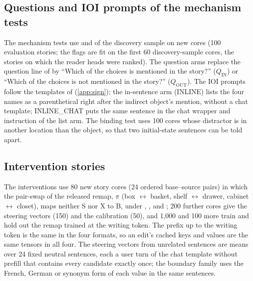 \subsection{Questions and IOI prompts of the mechanism tests}\label{app:prompts-mechanism}

The mechanism tests use \fmtOpt{} and \fmtPost{} of the discovery sample on new cores (100 evaluation stories; the flags are fit on the first 60 discovery-sample cores, the stories on which the reader heads were ranked). The question arms replace the question line of \fmtOpt{} by ``Which of the choices is mentioned in the story?'' ($Q_{\mathrm{IN}}$) or ``Which of the choices is not mentioned in the story?'' ($Q_{\mathrm{OUT}}$). The IOI prompts follow the templates of \citet{wang2022ioi} (\cref{app:sign}); the in-sentence arm (INLINE) lists the four names as a parenthetical right after the indirect object's mention, without a chat template; INLINE\_CHAT puts the same sentence in the chat wrapper and instruction of the list arm. The binding test uses 100 cores whose distractor is in another location than the object, so that two initial-state sentences can be told apart. %

\subsection{Intervention stories}\label{app:prompts-intervention}

The interventions use 80 new story cores (24 ordered base--source pairs) in which the pair-swap of the released remap, $\pi$ (box $\leftrightarrow$ basket, shelf $\leftrightarrow$ drawer, cabinet $\leftrightarrow$ closet), maps neither S nor X to B, under \fmtLetter{}, \fmtOpt{}, \fmtPost{} and \fmtNone{}; 200 further cores give the steering vectors (150) and the calibration (50), and 1{,}000 and 100 more train and hold out the remap trained at the writing token. The prefix up to the writing token is the same in the four formats, so an edit's cached keys and values are the same tensors in all four. The steering vectors from unrelated sentences are means over 24 fixed neutral sentences, each a user turn of the chat template without prefill that contains every candidate exactly once; the boundary family uses the French, German or synonym form of each value in the same sentences. %
